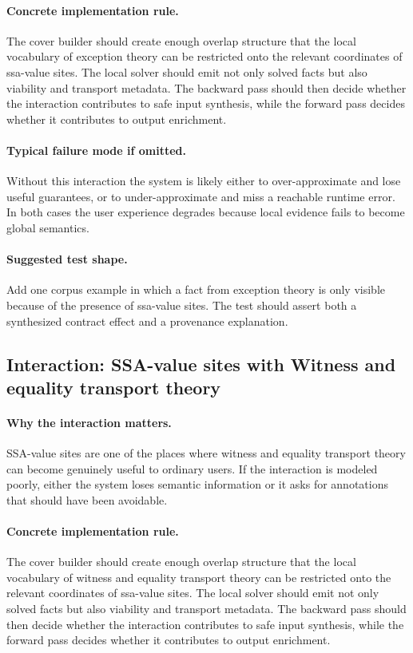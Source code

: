 \documentclass[11pt]{report}
\theoremstyle{definition}
\theoremstyle{plain}
\begin{document}
\paragraph{Concrete implementation rule.}
The cover builder should create enough overlap structure that the local
vocabulary of exception theory can be restricted onto the relevant
coordinates of ssa-value sites. The local solver should emit not only
solved facts but also viability and transport metadata. The backward pass
should then decide whether the interaction contributes to safe input
synthesis, while the forward pass decides whether it contributes to output
enrichment.

\paragraph{Typical failure mode if omitted.}
Without this interaction the system is likely either to over-approximate and
lose useful guarantees, or to under-approximate and miss a reachable runtime
error. In both cases the user experience degrades because local evidence
fails to become global semantics.

\paragraph{Suggested test shape.}
Add one corpus example in which a fact from exception theory is only
visible because of the presence of ssa-value sites. The test should
assert both a synthesized contract effect and a provenance explanation.

\subsection{Interaction: SSA-value sites with Witness and equality transport theory}

\paragraph{Why the interaction matters.}
SSA-value sites are one of the places where witness and equality transport theory can become
genuinely useful to ordinary users. If the interaction is modeled poorly,
either the system loses semantic information or it asks for annotations that
should have been avoidable.

\paragraph{Concrete implementation rule.}
The cover builder should create enough overlap structure that the local
vocabulary of witness and equality transport theory can be restricted onto the relevant
coordinates of ssa-value sites. The local solver should emit not only
solved facts but also viability and transport metadata. The backward pass
should then decide whether the interaction contributes to safe input
synthesis, while the forward pass decides whether it contributes to output
enrichment.
\end{document}
